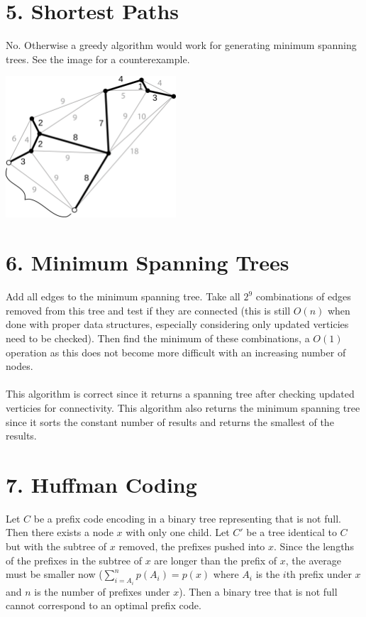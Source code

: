 \documentclass{article}
\begin{document}
\section*{5. Shortest Paths}
No. Otherwise a greedy algorithm would work for generating minimum spanning
trees. See the image for a counterexample.

\includegraphics[width=240px]{graphs/mst.png}

\section*{6. Minimum Spanning Trees}
Add all edges to the minimum spanning tree. Take all $2^9$ combinations of
edges removed from this tree and test if they are connected (this is still
$O(n)$ when done with proper data structures, especially considering only
updated verticies need to be checked). Then find the minimum of these
combinations, a $O(1)$ operation as this does not become more difficult with
an increasing number of nodes.
\\\\
This algorithm is correct since it returns a spanning tree after checking
updated verticies for connectivity. This algorithm also returns the
minimum spanning tree since it sorts the constant number of results and
returns the smallest of the results.

\section*{7. Huffman Coding}
Let $C$ be a prefix code encoding in a binary tree representing that is not
full. Then there exists a node $x$ with only one child. Let $C'$ be a tree
identical to $C$ but with the subtree of $x$ removed, the prefixes pushed into
$x$. Since the lengths of the prefixes in the subtree of $x$ are longer than
the prefix of $x$, the average must be smaller now
($\sum_{ i = A_i }^n { p(A_i) } = p(x)$ where $A_i$ is the $i$th prefix
under $x$ and $n$ is the number of prefixes under $x$). Then a binary tree
that is not full cannot correspond to an optimal prefix code.
\end{document}
